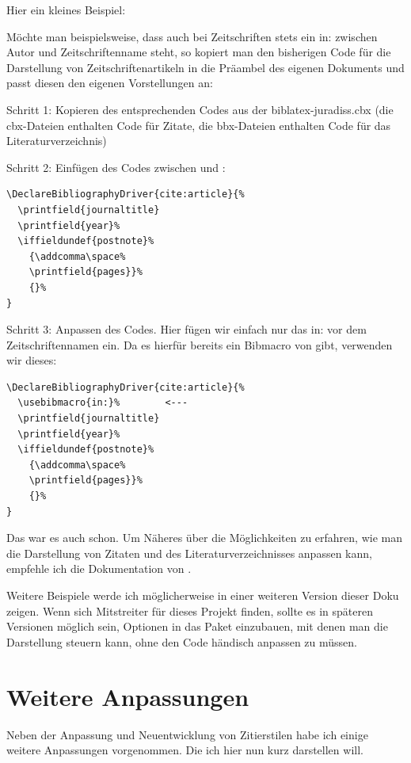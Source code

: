 Hier ein kleines Beispiel:

Möchte man beispielsweise, dass auch bei Zeitschriften stets ein in: zwischen Autor und 
Zeitschriftenname steht, so kopiert man den bisherigen Code für die Darstellung von 
Zeitschriftenartikeln in die Präambel des eigenen Dokuments und passt diesen den eigenen 
Vorstellungen an:

Schritt 1: Kopieren des entsprechenden Codes aus der biblatex-juradiss.cbx (die cbx-Dateien 
enthalten Code für Zitate, die bbx-Dateien enthalten Code für das Literaturverzeichnis)

Schritt 2: Einfügen des Codes zwischen  und :

\begin{lstlisting}
\DeclareBibliographyDriver{cite:article}{%
  \printfield{journaltitle}
  \printfield{year}%
  \iffieldundef{postnote}%
    {\addcomma\space%
    \printfield{pages}}%
    {}%
}
\end{lstlisting}

Schritt 3: Anpassen des Codes. Hier fügen wir einfach nur das in: vor dem Zeitschriftennamen ein. Da 
es hierfür bereits ein Bibmacro von \bib gibt, verwenden wir dieses:

\begin{lstlisting}
\DeclareBibliographyDriver{cite:article}{%
  \usebibmacro{in:}%		<---
  \printfield{journaltitle}
  \printfield{year}%
  \iffieldundef{postnote}%
    {\addcomma\space%
    \printfield{pages}}%
    {}%
}
\end{lstlisting}

Das war es auch schon. Um Näheres über die Möglichkeiten zu erfahren, wie man die Darstellung von 
Zitaten und des Literaturverzeichnisses anpassen kann, empfehle ich die Dokumentation von \bib.

Weitere Beispiele werde ich möglicherweise in einer weiteren Version dieser Doku zeigen. Wenn sich 
Mitstreiter für dieses Projekt finden, sollte es in späteren Versionen möglich sein, Optionen in das 
Paket einzubauen, mit denen man die Darstellung steuern kann, ohne den Code händisch anpassen zu müssen.


\section{Weitere Anpassungen}


Neben der Anpassung und Neuentwicklung von Zitierstilen habe ich einige weitere Anpassungen vorgenommen. 
Die ich hier nun kurz darstellen will.


